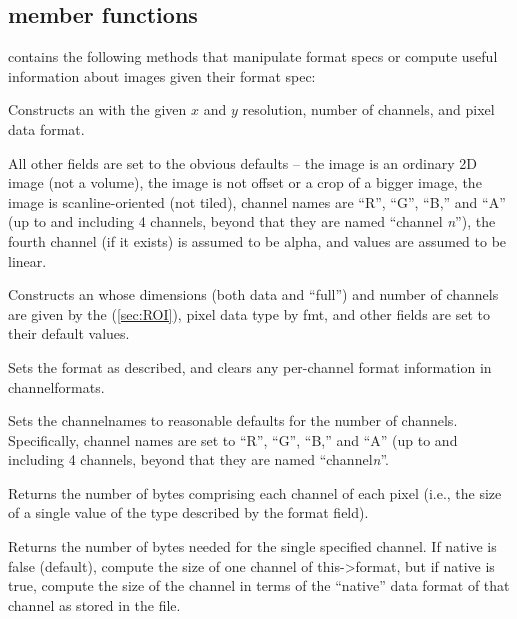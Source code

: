\subsection{\ImageSpec member functions}
\label{sec:ImageSpecMemberFuncs}

\noindent \ImageSpec contains the following methods that
manipulate format specs or compute useful information about images given
their format spec:

Constructs an \ImageSpec with the given $x$ and $y$ resolution, number
of channels, and pixel data format.

All other fields are set to the obvious defaults -- the image is an
ordinary 2D image (not a volume), the image is not offset or a crop of a
bigger image, the image is scanline-oriented (not tiled), channel names
are ``R'', ``G'', ``B,'' and ``A'' (up to and including 4 channels,
beyond that they are named ``channel \emph{n}''), the fourth channel (if
it exists) is assumed to be alpha, and values are assumed to be linear.
\apiend

Constructs an \ImageSpec whose dimensions (both data and ``full'') and
number of channels are given by the \ROI (\ref{sec:ROI}), pixel data type
by {\cf fmt}, and other fields are set to their default values.
\apiend

Sets the format as described, and clears any per-channel format information
in {\cf channelformats}.
\apiend

Sets the {\cf channelnames} to reasonable defaults for the number of
channels.  Specifically, channel names are set to ``R'', ``G'', ``B,''
and ``A'' (up to and including 4 channels, beyond that they are named
``channel\emph{n}''.
\apiend

Returns the number of bytes comprising each channel of each pixel (i.e.,
the size of a single value of the type described by the {\cf format} field).
\apiend

Returns the number of bytes needed for the single specified
channel.  If native is {\cf false} (default), compute the size of one
channel of {\cf this->format}, but if native is {\cf true}, compute the size
of the channel in terms of the ``native'' data format of that
channel as stored in the file.
\apiend

